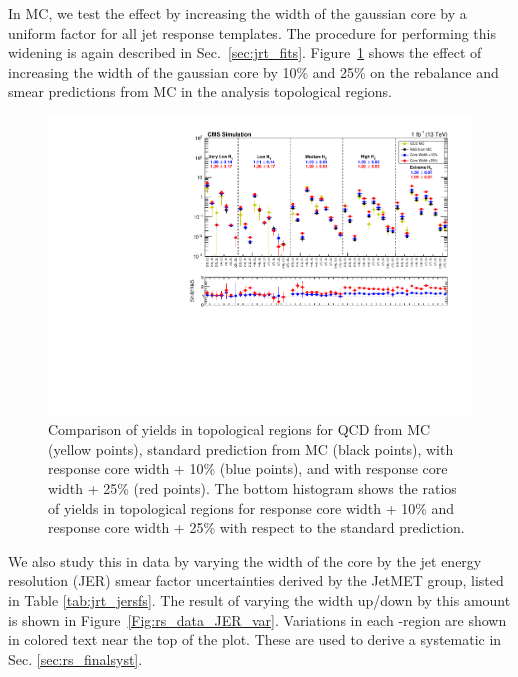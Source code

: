 In MC, we test the effect by increasing the width of the gaussian core by a uniform factor for all jet response templates. 
The procedure for performing this widening is again described in Sec.~\ref{sec:jrt_fits}. 
Figure~\ref{Fig:rs_modify_core} shows the effect of increasing the width of the gaussian core by 10\% and 25\% on the rebalance and smear predictions from MC in the 
analysis topological regions.

\begin{figure}[ht]
  \begin{center}
    \includegraphics[width=1.0\textwidth]{figs/qcd/rs_mc/mc_coreWidth.pdf}
    \caption{Comparison of yields in topological regions for QCD from MC (yellow points), standard \rs prediction from MC (black points), \rs with response core width + 10\% (blue points), and
             \rs with response core width + 25\% (red points). The bottom histogram shows the ratios of yields in topological regions for response core width + 10\% and response core width + 25\%
             with respect to the standard \rs prediction.
            }
    \label{Fig:rs_modify_core}
  \end{center}
\end{figure}

We also study this in data by varying the width of the core by the jet energy resolution (JER) smear factor uncertainties derived by the JetMET group, listed in Table \ref{tab:jrt_jersfs}.
The result of varying the width up/down by this amount is shown in Figure~\ref{Fig:rs_data_JER_var}. Variations in each \Ht-region are shown in colored text near
the top of the plot. These are used to derive a systematic in Sec. \ref{sec:rs_finalsyst}.

